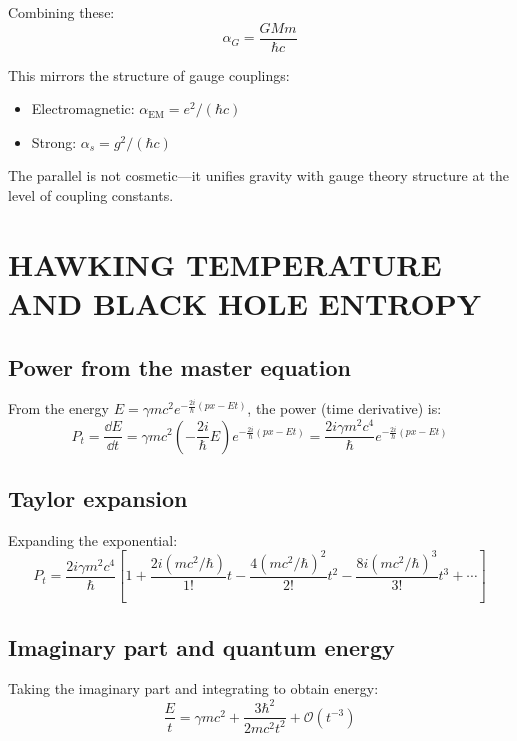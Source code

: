 \documentclass[11pt,a4paper]{article}
\theoremstyle{definition}
\theoremstyle{remark}
\begin{document}
	Combining these:
	\begin{equation}
		\boxed{\alpha_G = \frac{GMm}{\hbar c}}
		\label{eq:alpha_gravity}
	\end{equation}
	
	This mirrors the structure of gauge couplings:
	\begin{itemize}
		\item Electromagnetic: $\alpha_{\text{EM}} = e^2/(\hbar c)$
		\item Strong: $\alpha_s = g^2/(\hbar c)$
	\end{itemize}
	
	The parallel is not cosmetic---it unifies gravity with gauge theory structure at the level of coupling constants.
	
	\section{HAWKING TEMPERATURE AND BLACK HOLE ENTROPY}
	\label{sec:hawking}
	
	\subsection{Power from the master equation}
	
	From the energy $E = \gamma mc^2 e^{-\frac{2i}{\hbar}(px-Et)}$, the power (time derivative) is:
	\begin{equation}
		P_t = \frac{\dd E}{\dd t} = \gamma mc^2 \left(-\frac{2i}{\hbar}E\right) e^{-\frac{2i}{\hbar}(px-Et)} = \frac{2i\gamma m^2 c^4}{\hbar} e^{-\frac{2i}{\hbar}(px-Et)}
		\label{eq:power}
	\end{equation}
	
	\subsection{Taylor expansion}
	
	Expanding the exponential:
	\begin{equation}
		P_t = \frac{2i\gamma m^2 c^4}{\hbar}\left[1 + \frac{2i(mc^2/\hbar)}{1!}t - \frac{4(mc^2/\hbar)^2}{2!}t^2 - \frac{8i(mc^2/\hbar)^3}{3!}t^3 + \cdots\right]
		\label{eq:taylor_power}
	\end{equation}
	
	\subsection{Imaginary part and quantum energy}
	
	Taking the imaginary part and integrating to obtain energy:
	\begin{equation}
		\frac{E}{t} = \gamma mc^2 + \frac{3\hbar^2}{2mc^2 t^2} + \mathcal{O}(t^{-3})
		\label{eq:quantum_energy}
	\end{equation}
	
\end{document}
